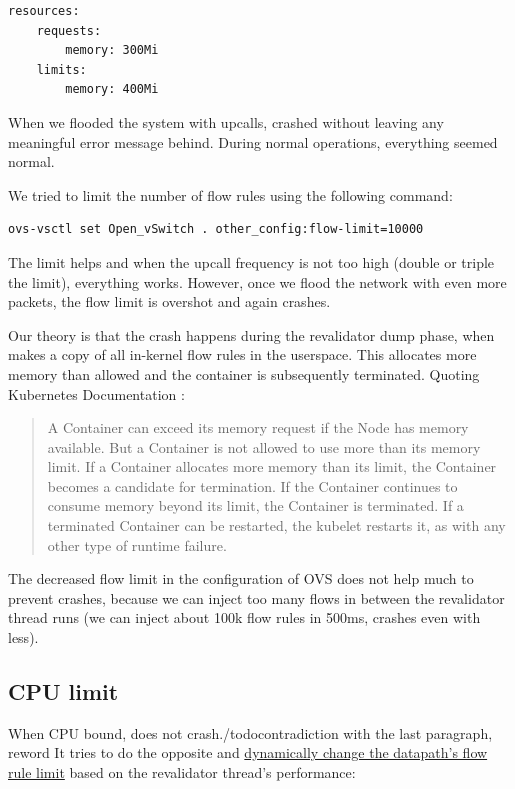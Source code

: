 \begin{verbatim}
resources:
    requests:
        memory: 300Mi
    limits:
        memory: 400Mi
\end{verbatim}

When we flooded the system with upcalls,  crashed without leaving any meaningful error message behind. During normal operations, everything seemed normal.

We tried to limit the number of flow rules using the following command:
\begin{verbatim}
ovs-vsctl set Open_vSwitch . other_config:flow-limit=10000
\end{verbatim}

The limit helps and when the upcall frequency is not too high (double or triple the limit), everything works. However, once we flood the network with even more packets, the flow limit is overshot and  again crashes.

Our theory is that the crash happens during the revalidator dump phase, when  makes a copy of all in-kernel flow rules in the userspace. This allocates more memory than allowed and the container is subsequently terminated. Quoting Kubernetes Documentation \cite{KubeMemoryLimits}:

\begin{quote}
    A Container can exceed its memory request if the Node has memory available. But a Container is not allowed to use more than its memory limit. If a Container allocates more memory than its limit, the Container becomes a candidate for termination. If the Container continues to consume memory beyond its limit, the Container is terminated. If a terminated Container can be restarted, the kubelet restarts it, as with any other type of runtime failure.
\end{quote}

The decreased flow limit in the configuration of OVS does not help much to prevent crashes, because we can inject too many flows in between the revalidator thread runs (we can inject about 100k flow rules in 500ms,  crashes even with less).

\subsection{CPU limit}
\label{subsec:cpu-limit}

When CPU bound,  does not crash./todo{contradiction with the last paragraph, reword} It tries to do the opposite and \href{https://github.com/openvswitch/ovs/blob/e3ba0be48ca457ab3a1c9f1e3522e82218eca0f9/ofproto/ofproto-dpif-upcall.c\#L1031-L1041}{dynamically change the datapath's flow rule limit} based on the revalidator thread's performance:

